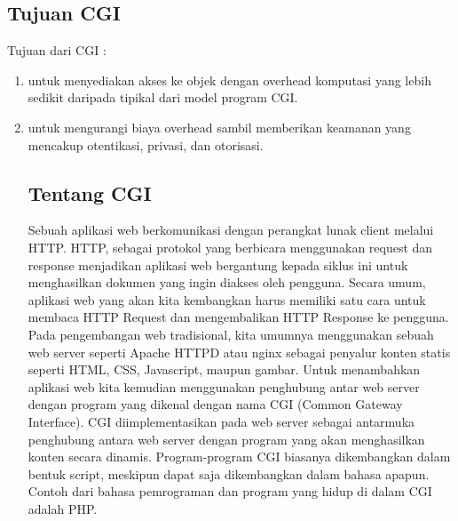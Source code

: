 \subsection{Tujuan CGI}
Tujuan dari CGI :
\begin{enumerate}
\item untuk menyediakan akses ke objek dengan overhead komputasi yang lebih sedikit daripada tipikal dari model program CGI.
\item untuk mengurangi biaya overhead sambil memberikan keamanan yang mencakup otentikasi, privasi, dan otorisasi.

\subsection{ Tentang CGI}
Sebuah aplikasi web berkomunikasi dengan perangkat lunak client melalui HTTP. HTTP, sebagai protokol yang berbicara menggunakan request dan response menjadikan aplikasi web bergantung kepada siklus ini untuk menghasilkan dokumen yang ingin diakses oleh pengguna. Secara umum, aplikasi web yang akan kita kembangkan harus memiliki satu cara untuk membaca HTTP Request dan mengembalikan HTTP Response ke pengguna. 
	Pada pengembangan web tradisional, kita umumnya menggunakan sebuah web server seperti Apache HTTPD atau nginx sebagai penyalur konten statis seperti HTML, CSS, Javascript, maupun gambar. Untuk menambahkan aplikasi web kita kemudian menggunakan penghubung antar web server dengan program yang dikenal dengan nama CGI (Common Gateway Interface). 
	CGI diimplementasikan pada web server sebagai antarmuka penghubung antara web server dengan program yang akan menghasilkan konten secara dinamis. Program-program CGI biasanya dikembangkan dalam bentuk script, meskipun dapat saja dikembangkan dalam bahasa apapun. Contoh dari bahasa pemrograman dan program yang hidup di dalam CGI adalah PHP.


\end{enumerate}
